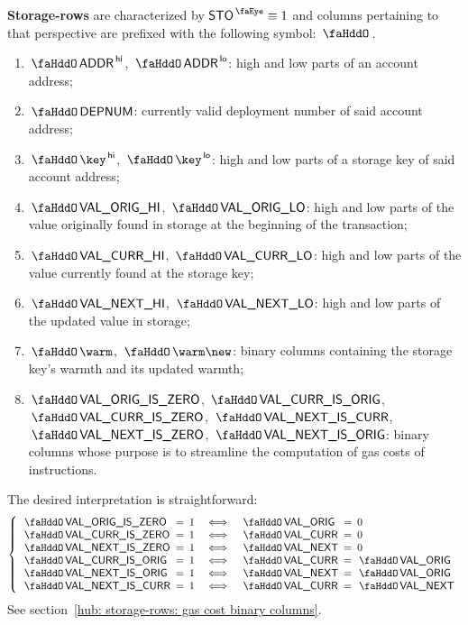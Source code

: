 \textbf{Storage-rows} are characterized by $\peekStorage \equiv 1$ and columns pertaining to that perspective are prefixed with the following symbol: $\storageSignifier$.
\begin{enumerate}
	\item $\stoAddressHi$, $\stoAddressLo$:
		high and low parts of an account address;
	\item $\stoDeploymentNumber$:
		currently valid deployment number of said account address;
	\item $\stoKeyHi$, $\stoKeyLo$:
		high and low parts of a storage key of said account address;
	\item $\stoOrigValueHi$, $\stoOrigValueLo$:
		high and low parts of the value originally found in storage at the beginning of the transaction;
	\item $\stoCurrValueHi$, $\stoCurrValueLo$:
		high and low parts of the value currently found at the storage key;
	\item $\stoNextValueHi$, $\stoNextValueLo$:
		high and low parts of the updated value in storage;
	\item $\stoWarmth$, $\stoWarmth\new$:
		binary columns containing the storage key's warmth and its updated warmth; 
	\item
		$\stoOrigValueIsZero$,
		$\stoCurrValueIsOrig$,
		$\stoCurrValueIsZero$,
		$\stoNextValueIsCurr$,
		$\stoNextValueIsZero$,
		$\stoNextValueIsOrig$:
		binary columns whose purpose is to streamline the computation of gas costs of  instructions.
\end{enumerate}
The desired interpretation is straightforward:
\[
	\left\{ \begin{array}{lclclcl}
		\stoOrigValueIsZero & \!\!\! = \!\!\! & 1 & \iff & \stoOrigValue & \!\!\! = \!\!\! & 0           \\
		\stoCurrValueIsZero & \!\!\! = \!\!\! & 1 & \iff & \stoCurrValue & \!\!\! = \!\!\! & 0           \\
		\stoNextValueIsZero & \!\!\! = \!\!\! & 1 & \iff & \stoNextValue & \!\!\! = \!\!\! & 0           \\
		\stoCurrValueIsOrig & \!\!\! = \!\!\! & 1 & \iff & \stoCurrValue & \!\!\! = \!\!\! & \stoOrigValue \\
		\stoNextValueIsOrig & \!\!\! = \!\!\! & 1 & \iff & \stoNextValue & \!\!\! = \!\!\! & \stoOrigValue \\
		\stoNextValueIsCurr & \!\!\! = \!\!\! & 1 & \iff & \stoCurrValue & \!\!\! = \!\!\! & \stoNextValue \\
	\end{array} \right.
\]
See section~\ref{hub: storage-rows: gas cost binary columns}.
